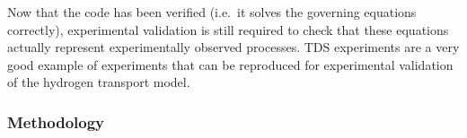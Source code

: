 Now that the code has been verified (i.e.\ it solves the governing equations correctly), experimental validation is still required to check that these equations actually represent experimentally observed processes.
TDS experiments are a very good example of experiments that can be reproduced for experimental validation of the hydrogen transport model.

\subsubsection{Methodology} \label{methodology}


